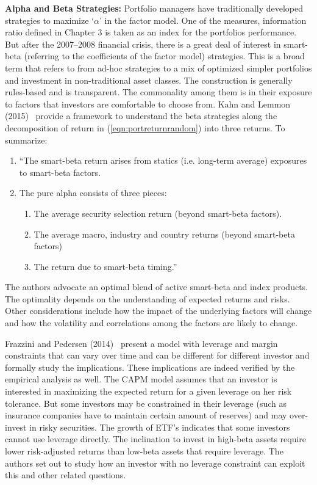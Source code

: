 \noindent\textbf{Alpha and Beta Strategies:} Portfolio managers have traditionally developed strategies to maximize `$\alpha$' in the factor model. One of the measures, information ratio defined in Chapter 3 is taken as an index for the portfolios performance. But after the 2007--2008 financial crisis, there is a great deal of interest in smart-beta (referring to the coefficients of the factor model) strategies. This is a broad term that refers to from ad-hoc strategies to a mix of optimized simpler portfolios and investment in non-traditional asset classes. The construction is generally rules-based and is transparent. The commonality among them is in their exposure to factors that investors are comfortable to choose from. Kahn and Lemmon (2015)~\cite{lemmon} provide a framework to understand the beta strategies along the decomposition of return in (\ref{eqn:portreturnrandom}) into three returns. To summarize:
	\begin{enumerate}[--]
	\item ``The smart-beta return arises from statics (i.e. long-term average) exposures to smart-beta factors.
	\item The pure alpha consists of three pieces:
		\begin{enumerate}[1.]
		\item The average security selection return (beyond smart-beta factors).
		\item The average macro, industry and country returns (beyond smart-beta factors)
		\item The return due to smart-beta timing.''
		\end{enumerate}
	\end{enumerate}
The authors advocate an optimal blend of active smart-beta and index products. The optimality depends on the understanding of expected returns and risks. Other considerations include how the impact of the underlying factors will change and how the volatility and correlations among the factors are likely to change. 


Frazzini and Pedersen (2014)~\cite{frazped} present a model with leverage and margin constraints that can vary over time and can be different for different investor and formally study the implications. These implications are indeed verified by the empirical analysis as well. The CAPM model assumes that an investor is interested in maximizing the expected return for a given leverage on her risk tolerance. But some investors may be constrained in their leverage (such as insurance companies have to maintain certain amount of reserves) and may over-invest in risky securities. The growth of ETF's indicates that some investors cannot use leverage directly. The inclination to invest in high-beta assets require lower risk-adjusted returns than low-beta assets that require leverage. The authors set out to study how an investor with no leverage constraint can exploit this and other related questions. 


